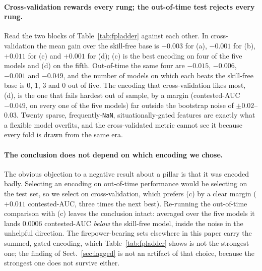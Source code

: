 \documentclass[11pt,a4paper]{article}
\begin{document}
\paragraph{Cross-validation rewards every rung; the out-of-time test rejects every rung.}
Read the two blocks of Table~\ref{tab:fpladder} against each other. In cross-validation the
mean gain over the skill-free base is $+0.003$ for (a), $-0.001$ for (b), $+0.011$ for (c)
and $+0.001$ for (d); (c) is the best encoding on four of the five models and (d) on the
fifth. Out-of-time the same four are $-0.015$, $-0.006$, $-0.001$ and $-0.049$, and the
number of models on which each beats the skill-free base is $0$, $1$, $3$ and $0$ out of
five. The encoding that cross-validation likes most, (d), is the one that fails hardest out
of sample, by a margin (contested-AUC $-0.049$, on every one of the five models) far outside
the bootstrap noise of $\pm 0.02$--$0.03$. Twenty sparse, frequently-\texttt{NaN},
situationally-gated features are exactly what a flexible model overfits, and the
cross-validated metric cannot see it because every fold is drawn from the same era.

\paragraph{The conclusion does not depend on which encoding we chose.}
The obvious objection to a negative result about a pillar is that it was encoded badly.
Selecting an encoding on out-of-time performance would be selecting on the test set, so we
select on cross-validation, which prefers (c) by a clear margin ($+0.011$ contested-AUC,
three times the next best). Re-running the out-of-time comparison with (c) leaves the
conclusion intact: averaged over the five models it lands $0.0006$ contested-AUC \emph{below}
the skill-free model, inside the noise in the unhelpful direction. The firepower-bearing sets
elsewhere in this paper carry the summed, gated encoding, which Table~\ref{tab:fpladder}
shows is not the strongest one; the finding of Sect.~\ref{sec:lagged} is not an artifact of
that choice, because the strongest one does not survive either.
\end{document}
